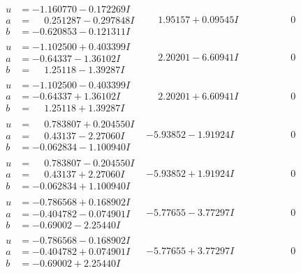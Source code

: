\documentclass[1p]{elsarticle_modified}
\theoremstyle{definition}
\begin{document}
$$\begin{array}{c|c|c}
\begin{aligned}
u &= -1.160770 - 0.172269 I \\
a &= \phantom{-}0.251287 - 0.297848 I \\
b &= -0.620853 - 0.121311 I\end{aligned}
 & \phantom{-}1.95157 + 0.09545 I & \phantom{-0.000000 } 0 \\ \hline\begin{aligned}
u &= -1.102500 + 0.403399 I \\
a &= -0.64337 - 1.36102 I \\
b &= \phantom{-}1.25118 - 1.39287 I\end{aligned}
 & \phantom{-}2.20201 - 6.60941 I & \phantom{-0.000000 } 0 \\ \hline\begin{aligned}
u &= -1.102500 - 0.403399 I \\
a &= -0.64337 + 1.36102 I \\
b &= \phantom{-}1.25118 + 1.39287 I\end{aligned}
 & \phantom{-}2.20201 + 6.60941 I & \phantom{-0.000000 } 0 \\ \hline\begin{aligned}
u &= \phantom{-}0.783807 + 0.204550 I \\
a &= \phantom{-}0.43137 - 2.27060 I \\
b &= -0.062834 - 1.100940 I\end{aligned}
 & -5.93852 - 1.91924 I & \phantom{-0.000000 } 0 \\ \hline\begin{aligned}
u &= \phantom{-}0.783807 - 0.204550 I \\
a &= \phantom{-}0.43137 + 2.27060 I \\
b &= -0.062834 + 1.100940 I\end{aligned}
 & -5.93852 + 1.91924 I & \phantom{-0.000000 } 0 \\ \hline\begin{aligned}
u &= -0.786568 + 0.168902 I \\
a &= -0.404782 - 0.074901 I \\
b &= -0.69002 - 2.25440 I\end{aligned}
 & -5.77655 - 3.77297 I & \phantom{-0.000000 } 0 \\ \hline\begin{aligned}
u &= -0.786568 - 0.168902 I \\
a &= -0.404782 + 0.074901 I \\
b &= -0.69002 + 2.25440 I\end{aligned}
 & -5.77655 + 3.77297 I & \phantom{-0.000000 } 0\\

\end{array}$$
\end{document}
